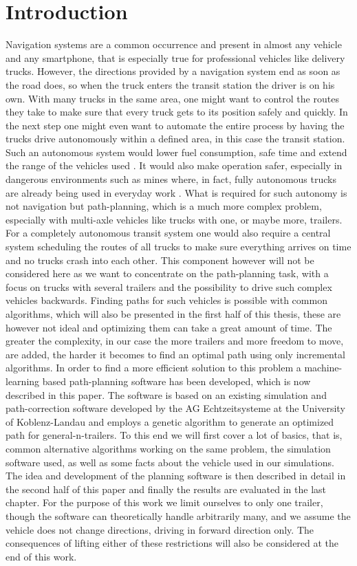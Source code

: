 \chapter{Introduction}
\label{cha:introduction}

Navigation systems are a common occurrence and present in almost any vehicle and any smartphone, that is especially true for professional vehicles like delivery trucks. However, the directions provided by a navigation system end as soon as the road does, so when the truck enters the transit station the driver is on his own. With many trucks in the same area, one might want to control the routes they take to make sure that every truck gets to its position safely and quickly. In the next step one might even want to automate the entire process by having the trucks drive autonomously within a defined area, in this case the transit station. Such an autonomous system would lower fuel consumption, safe time and extend the range of the vehicles used \cite{37}. It would also make operation safer, especially in dangerous environments such as mines where, in fact, fully autonomous trucks are already being used in everyday work \cite{38}. What is required for such autonomy is not navigation but path-planning, which is a much more complex problem, especially with multi-axle vehicles like trucks with one, or maybe more, trailers. For a completely autonomous transit system one would also require a central system scheduling the routes of all trucks to make sure everything arrives on time and no trucks crash into each other. This component however will not be considered here as we want to concentrate on the path-planning task, with a focus on trucks with several trailers and the possibility to drive such complex vehicles backwards. Finding paths for such vehicles is possible with common algorithms, which will also be presented in the first half of this thesis, these are however not ideal and optimizing them can take a great amount of time. The greater the complexity, in our case the more trailers and more freedom to move, are added, the harder it becomes to find an optimal path using only incremental algorithms. In order to find a more efficient solution to this problem a machine-learning based path-planning software has been developed, which is now described in this paper. The software is based on an existing simulation and path-correction software developed by the AG Echtzeitsysteme at the University of Koblenz-Landau and employs a genetic algorithm to generate an optimized path for general-n-trailers.
To this end we will first cover a lot of basics, that is, common alternative algorithms working on the same problem, the simulation software used, as well as some facts about the vehicle used in our simulations. The idea and development of the planning software is then described in detail in the second half of this paper and finally the results are evaluated in the last chapter. For the purpose of this work we limit ourselves to only one trailer, though the software can theoretically handle arbitrarily many, and we assume the vehicle does not change directions, driving in forward direction only. The consequences of lifting either of these restrictions will also be considered at the end of this work.
